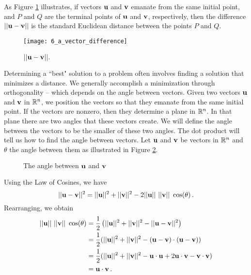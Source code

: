 As Figure \ref{F:6_a_vector_difference} illustrates, if vectors $\mathbf{u}$ and $\mathbf{v}$ emanate from the same initial point, and $P$ and $Q$ are the terminal points of $\mathbf{u}$ and $\mathbf{v}$, respectively, then the difference $|| \mathbf{u} - \mathbf{v}||$  is the standard Euclidean distance between the points $P$ and $Q$. 
\begin{figure}[ht] \centering
\texttt{[image: 6\_a\_vector\_difference]}
\caption{$|| \mathbf{u} - \mathbf{v}||$.}
\label{F:6_a_vector_difference}
\end{figure}



\label{sec:angle_vec}

Determining a ``best" solution to a problem often involves finding a solution that minimizes a distance. We generally accomplish a minimization through orthogonality --  which depends on the angle between vectors. Given two vectors $\mathbf{u}$ and $\mathbf{v}$ in $\mathbb{R}^n$, we position the vectors so that they emanate from the same initial point. If the vectors are nonzero, then they determine a plane in $\mathbb{R}^n$. In that plane there are two angles that these vectors create. We will define the angle between the vectors to be the smaller of these two angles. The dot product will tell us how to find the angle between vectors. Let $\mathbf{u}$ and $\mathbf{v}$ be vectors in $\mathbb{R}^n$ and $\theta$ the angle between them as illustrated in Figure \ref{F:Angle}.
\begin{figure}[h]
\begin{center}
\end{center}
\caption{The angle between $\mathbf{u}$ and $\mathbf{v}$}
\label{F:Angle}
\end{figure}
Using the Law of Cosines, we have
\[ ||\vu-\vv||^2=||\vu||^2+||\vv||^2 - 2||\vu|| \ ||\vv|| \ \cos(\theta) \,.\]
Rearranging, we obtain 
\begin{align*}
||\mathbf{u}|| \ ||\mathbf{v}|| \ \cos(\theta) &= \frac{1}{2} \left( ||\mathbf{u}||^2+||\mathbf{v}||^2 - ||\mathbf{u}-\mathbf{v}||^2 \right) \\
&= \frac{1}{2} (||\mathbf{u}||^2+||\mathbf{v}||^2 - (\mathbf{u}-\mathbf{v})\cdot (\mathbf{u}-\mathbf{v}) )\\
&= \frac{1}{2} (||\mathbf{u}||^2+||\mathbf{v}||^2 - \mathbf{u}\cdot \mathbf{u} +2\mathbf{u} \cdot \mathbf{v} - \mathbf{v}\cdot \mathbf{v} ) \\
&= \mathbf{u} \cdot \mathbf{v}  \, .
\end{align*}
